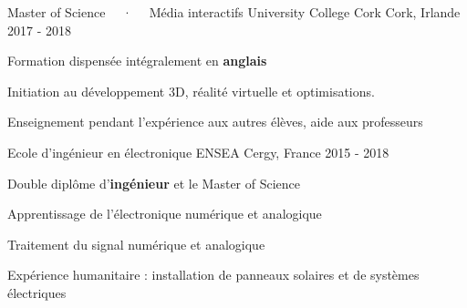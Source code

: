 

\begin{cventries}

	\cventry
	{Master of Science ~~·~~ Média interactifs} %
	{University College Cork} %
	{Cork, Irlande} %
	{2017 - 2018} %
	{
		\begin{cvitems}
			\item Formation dispensée intégralement en \textbf{anglais}
			\item Initiation au développement 3D, réalité virtuelle et optimisations.
			\item Enseignement pendant l'expérience aux autres élèves, aide aux professeurs
		\end{cvitems}
	}

	\cventry
	{Ecole d'ingénieur en électronique}
	{ENSEA} %
	{Cergy, France} %
	{2015 - 2018} %
	{
		\begin{cvitems}
			\item Double diplôme d'\textbf{ingénieur} et le Master of Science
			\item Apprentissage de l'électronique numérique et analogique
			\item Traitement du signal numérique et analogique
			\item Expérience humanitaire : installation de panneaux solaires et de systèmes électriques
		\end{cvitems}
	}
\end{cventries}
